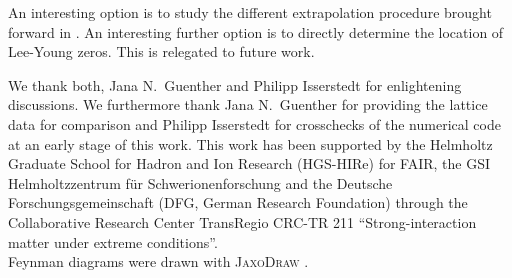 \documentclass[%
    aps,
    prd,
    reprint,
    superscriptaddress,
    floatfix,
    nofootinbib,
    noamsmath,
    noamssymb
]{revtex4-2}
\newcommand*{\+}{\hspace*{.08335em}}
\newcommand*{\?}{\hspace*{-.08335em}}
\begin{document}
An interesting option is to study the different extrapolation procedure 
brought forward in \cite{Dimopoulos:2021vrk}. An interesting further option is
to directly determine the location of Lee-Young zeros. This is relegated to future work.



\begin{acknowledgments}
We thank both, Jana N.~Guenther and Philipp Isserstedt for enlightening
discussions. We furthermore thank Jana N.~Guenther for providing the lattice
data for comparison and Philipp Isserstedt for crosschecks of the numerical
code at an early stage of this work. This work has been supported by the
Helmholtz Graduate School for Hadron and Ion Research (HGS-HIRe) for FAIR, the
GSI Helmholtzzentrum f\"{u}r Schwerionenforschung and the Deutsche
Forschungsgemeinschaft (DFG, German Research Foundation) through the
Collaborative Research Center TransRegio CRC-TR 211 ``Strong-interaction matter
under extreme conditions''.\\
Feynman diagrams were drawn with \textsc{JaxoDraw} \cite{Binosi:2008ig}.
\end{acknowledgments}



\end{document}
